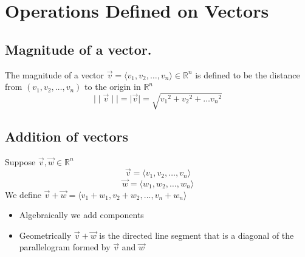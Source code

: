 \documentclass{article}
\begin{document}
\section*{Operations Defined on Vectors}
\subsection*{Magnitude of a vector.}
The magnitude of a vector $\vec{v} = \langle v_1, v_2, \dots , v_n \rangle \in \mathbb{R}^n$ is 
defined to be the distance from $(v_1, v_2, \dots , v_n)$ to the origin in $\mathbb{R}^n$
\[
\mid\mid\vec{v}\mid\mid = \mid\vec{v}\mid = \sqrt{{v_1}^2+{v_2}^2+\dots {v_n}^2}
\]

\subsection*{Addition of vectors}
Suppose $\vec{v}, \vec{w} \in \mathbb{R}^n$
\[
    \vec{v} = \langle v_1, v_2, \dots , v_n \rangle
\]
\[
    \vec{w} = \langle w_1, w_2, \dots , w_n \rangle
\]
We define $\vec{v} + \vec{w} = \langle v_1 + w_1, v_2 + w_2, ... , v_n + w_n \rangle$

\begin{itemize}
    \item Algebraically we add components
    \item Geometrically $\vec{v} + \vec{w}$ is the directed line segment that is a diagonal of the
    parallelogram formed by $\vec{v}$ and $\vec{w}$
\begin{center}
\end{center}
\end{itemize}
\end{document}

